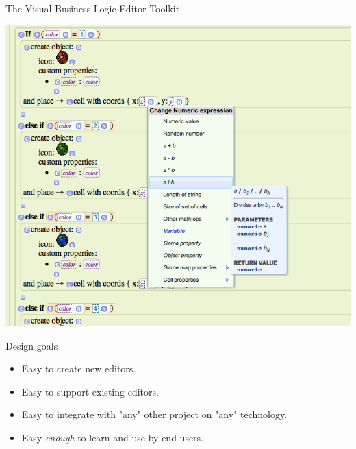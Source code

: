 \documentclass[handout]{beamer}
\begin{document}

\begin{frame}{The Visual Business Logic Editor Toolkit}

\includegraphics[height=.8\textheight]{gamector}

\end{frame}


\begin{frame}{Design goals}

\begin{itemize}
\item Easy to create new editors.
\item Easy to support existing editors.
\item Easy to integrate with "any" other project on "any" technology.
\item Easy \textit{enough} to learn and use by end-users.
\end{itemize}

\end{frame}

\end{document}
